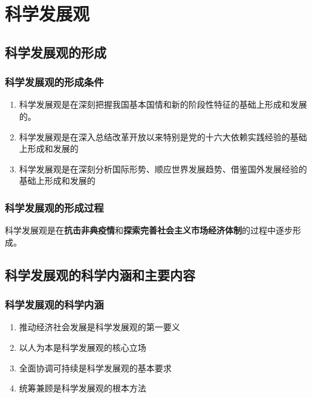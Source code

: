 \chapter{科学发展观}

\section{科学发展观的形成}
    \subsection{科学发展观的形成条件}
        \begin{enumerate}
            \item 科学发展观是在深刻把握我国基本国情和新的阶段性特征的基础上形成和发展的。
            \item 科学发展观是在深入总结改革开放以来特别是党的十六大依赖实践经验的基础上形成和发展的
            \item 科学发展观是在深刻分析国际形势、顺应世界发展趋势、借鉴国外发展经验的基础上形成和发展的
        \end{enumerate}

    \subsection{科学发展观的形成过程}
        科学发展观是在\textbf{抗击非典疫情}和\textbf{探索完善社会主义市场经济体制}的过程中逐步形成。


\section{科学发展观的科学内涵和主要内容}
    \subsection{科学发展观的科学内涵}
        \begin{enumerate}
            \item 推动经济社会发展是科学发展观的第一要义
            \item 以人为本是科学发展观的核心立场
            \item 全面协调可持续是科学发展观的基本要求
            \item 统筹兼顾是科学发展观的根本方法
        \end{enumerate}

